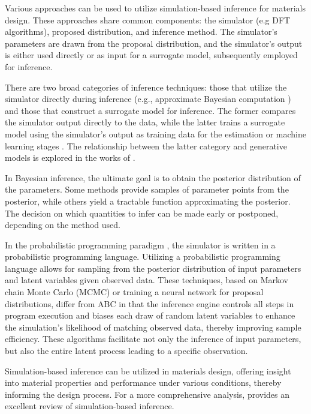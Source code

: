 Various approaches can be used to utilize simulation-based inference for materials design. These approaches share common components: the simulator (e.g DFT algorithms), proposed distribution, and inference method. The simulator's parameters are drawn from the proposal distribution, and the simulator's output is either used directly or as input for a surrogate model, subsequently employed for inference.

There are two broad categories of inference techniques: those that utilize the simulator directly during inference (e.g., approximate Bayesian computation \cite{10.1214/aos/1176346785, alsing2018massive, charnock2018automatic}) and those that construct a surrogate model for inference. The former compares the simulator output directly to the data, while the latter trains a surrogate model using the simulator's output as training data for the estimation or machine learning stages \cite{brehmer2020mining, cranmer2015approximating, stoye2018likelihood}. The relationship between the latter category and generative models is explored in the works of \citet{mohamed2016learning, louppe2019adversarial}.

In Bayesian inference, the ultimate goal is to obtain the posterior distribution of the parameters. Some methods provide samples of parameter points from the posterior, while others yield a tractable function approximating the posterior. The decision on which quantities to infer can be made early or postponed, depending on the method used.

In the probabilistic programming paradigm \cite{le2017inference}, the simulator is written in a probabilistic programming language. Utilizing a probabilistic programming language allows for sampling from the posterior distribution of input parameters and latent variables given observed data. These techniques, based on Markov chain Monte Carlo (MCMC) or training a neural network for proposal distributions, differ from ABC in that the inference engine controls all steps in program execution and biases each draw of random latent variables to enhance the simulation's likelihood of matching observed data, thereby improving sample efficiency. These algorithms facilitate not only the inference of input parameters, but also the entire latent process leading to a specific observation.

Simulation-based inference can be utilized in materials design, offering insight into material properties and performance under various conditions, thereby informing the design process. For a more comprehensive analysis, \citet{cranmerFrontierSimulationbasedInference2020a} provides an excellent review of simulation-based inference.

